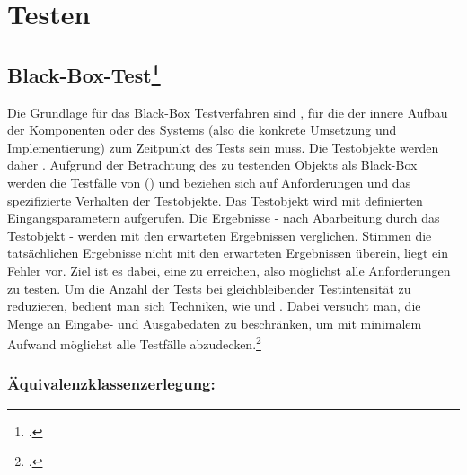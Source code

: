 \documentclass{lehramt-informatik-haupt}
\begin{document}

\chapter{Testen}

\begin{quellen}
\item \cite[Kapitel 4 „Software-Text“; Seite 157-246]{hoffmann}
\end{quellen}

%

\section{Black-Box-Test\footcite[Seite 32]{sosy:fs:5}}

Die Grundlage für das Black-Box Testverfahren sind , für die der innere Aufbau der Komponenten oder des
Systems (also die konkrete Umsetzung und Implementierung) zum Zeitpunkt
des Tests  sein muss. Die Testobjekte werden daher
. Aufgrund der
Betrachtung des zu testenden Objekts als Black-Box werden die Testfälle
von  () und beziehen sich auf
Anforderungen und das spezifizierte Verhalten der Testobjekte. Das
Testobjekt wird mit definierten Eingangsparametern aufgerufen. Die
Ergebnisse - nach Abarbeitung durch das Testobjekt - werden mit den
erwarteten Ergebnissen verglichen. Stimmen die tatsächlichen Ergebnisse
nicht mit den erwarteten Ergebnissen überein, liegt ein Fehler vor. Ziel
ist es dabei, eine  zu
erreichen, also möglichst alle Anforderungen zu testen. Um die Anzahl
der Tests bei gleichbleibender Testintensität zu reduzieren, bedient man
sich Techniken, wie  und
. Dabei versucht man, die Menge an Eingabe- und
Ausgabedaten zu beschränken, um mit minimalem Aufwand möglichst alle
Testfälle abzudecken.\footcite[Seite 140-141]{schatten}

%

\subsection{Äquivalenzklassenzerlegung:}
\end{document}
